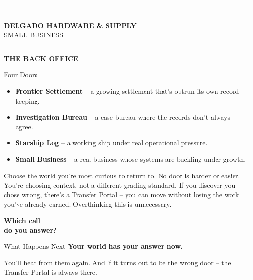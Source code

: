 \documentclass[aspectratio=169]{beamer}
\newcommand{\worldtitlecard}[3]{
\begin{frame}[plain]
  \begin{center}
    \vspace{2cm}
    {\color{#1}\rule{6cm}{2pt}}\\[8mm]
    {\Huge\bfseries\color{#1} #2}\\[4mm]
    {\Large\color{cs2inkSoft} #3}\\[8mm]
    {\color{#1}\rule{6cm}{2pt}}
  \end{center}
\end{frame}
}
\begin{document}
\worldtitlecard{worldbusiness}{DELGADO HARDWARE \& SUPPLY}{SMALL BUSINESS}

\begin{frame}[plain]
  \vspace{3cm}
  \begin{center}
    {\Large\color{worldbusiness}\textbf{THE BACK OFFICE}}
  \end{center}
\end{frame}

\begin{frame}{Four Doors}
  \begin{itemize}
    \item[] \textbf{\color{worldfrontier}Frontier Settlement} -- a growing settlement that's outrun its own record-keeping.
    \item[] \textbf{\color{worldinvestigation}Investigation Bureau} -- a case bureau where the records don't always agree.
    \item[] \textbf{\color{worldstarship}Starship Log} -- a working ship under real operational pressure.
    \item[] \textbf{\color{worldbusiness}Small Business} -- a real business whose systems are buckling under growth.
  \end{itemize}
  \vspace{3mm}
  \small\color{cs2inkSoft}
  Choose the world you're most curious to return to. No door is
  harder or easier. You're choosing context, not a different grading
  standard. If you discover you chose wrong, there's a Transfer
  Portal -- you can move without losing the work you've already
  earned. Overthinking this is unnecessary.
\end{frame}

\begin{frame}[plain]
  \vspace{2.5cm}
  \begin{center}
    {\Huge\bfseries\color{cs2primary} Which call\\[2mm]do you answer?}
  \end{center}
\end{frame}

\begin{exitframe}{What Happens Next}
  \Large\color{cs2primary}
  \textbf{Your world has your answer now.}

  \vspace{4mm}
  \normalsize\normalfont\color{cs2ink}
  You'll hear from them again. And if it turns out to be the wrong
  door -- the Transfer Portal is always there.
\end{exitframe}
\end{document}
